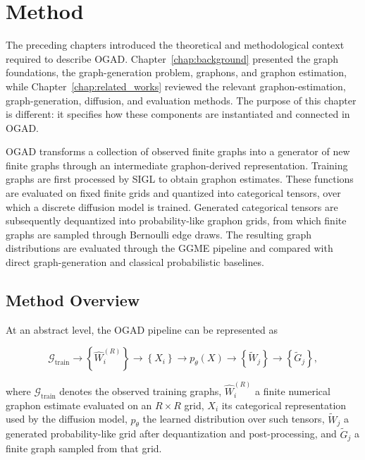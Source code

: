 \chapter{Method}
\label{chap:method}

The preceding chapters introduced the theoretical and methodological context required to describe OGAD. Chapter~\ref{chap:background} presented the graph foundations, the graph-generation problem, graphons, and graphon estimation, while Chapter~\ref{chap:related_works} reviewed the relevant graphon-estimation, graph-generation, diffusion, and evaluation methods. The purpose of this chapter is different: it specifies how these components are instantiated and connected in OGAD.

OGAD transforms a collection of observed finite graphs into a generator of new finite graphs through an intermediate graphon-derived representation. Training graphs are first processed by SIGL to obtain graphon estimates. These functions are evaluated on fixed finite grids and quantized into categorical tensors, over which a discrete diffusion model is trained. Generated categorical tensors are subsequently dequantized into probability-like graphon grids, from which finite graphs are sampled through Bernoulli edge draws. The resulting graph distributions are evaluated through the GGME pipeline and compared with direct graph-generation and classical probabilistic baselines.


\section{Method Overview}
\label{sec:method_overview}

At an abstract level, the OGAD pipeline can be represented as

\[
\mathcal{G}_{\mathrm{train}}
\longrightarrow
\left\{\widehat{W}^{(R)}_i\right\}
\longrightarrow
\left\{X_i\right\}
\longrightarrow
p_\theta(X)
\longrightarrow
\left\{\widetilde{W}_j\right\}
\longrightarrow
\left\{\widetilde{G}_j\right\},
\]

where \(\mathcal{G}_{\mathrm{train}}\) denotes the observed training graphs, \(\widehat{W}^{(R)}_i\) a finite numerical graphon estimate evaluated on an \(R\times R\) grid, \(X_i\) its categorical representation used by the diffusion model, \(p_\theta\) the learned distribution over such tensors, \(\widetilde{W}_j\) a generated probability-like grid after dequantization and post-processing, and \(\widetilde{G}_j\) a finite graph sampled from that grid.

